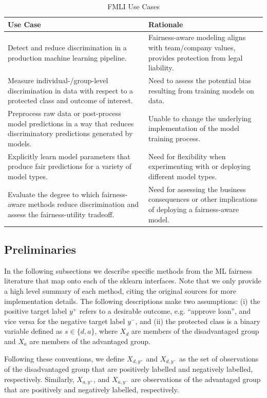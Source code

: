 \documentclass{interact}
\begin{document}
\begin{table}
  \caption{FMLI Use Cases}
  \renewcommand{\arraystretch}{1.75}
  \small\noindent\begin{tabularx}{\linewidth}{X X}
    \textbf{Use Case} & \textbf{Rationale} \\
    \hline
    Detect and reduce discrimination in a production machine learning pipeline.
      & Fairness-aware modeling aligns with team/company values,
        provides protection from legal liability. \\
    Measure individual-/group-level discrimination in data with respect to a
    protected class and outcome of interest.
      & Need to assess the potential bias resulting from training models on
        data. \\
    Preprocess raw data or post-process model predictions in a way that reduces
    discriminatory predictions generated by models.
      & Unable to change the underlying implementation of the model training
        process. \\
    Explicitly learn model parameters that produce fair predictions for a variety
    of model types.
      & Need for flexibility when experimenting with or deploying different model
        types. \\
    Evaluate the degree to which fairness-aware methods reduce discrimination
    and assess the fairness-utility tradeoff.
      & Need for assessing the business consequences or other implications of
        deploying a fairness-aware model.
  \end{tabularx}
\end{table}

\subsection{Preliminaries} In the following subsections we describe specific
methods from the ML fairness literature that map onto each of the sklearn
interfaces. Note that we only provide a high level summary of each method,
citing the original sources for more implementation details. The following
descriptions make two assumptions: (i) the positive target label \(y^{+}\)
refers to a desirable outcome, e.g. ``approve loan'', and vice versa for the
negative target label \(y^{-}\), and (ii) the protected class is a binary
variable defined as \(s \in \{d, a\}\), where \(X_d\)  are members of the
disadvantaged group and \(X_a\) are members of the advantaged group.

Following these conventions, we define \(X_{d, y^{+}}\) and \(X_{d, y^{-}}\)
as the set of observations of the disadvantaged group that are positively
labelled and negatively labelled, respectively. Similarly, \(X_{a, y^{+}}\), and
\(X_{a, y^{-}}\)  are observations of the advantaged group that are positively
and negatively labelled, respectively.
\end{document}
